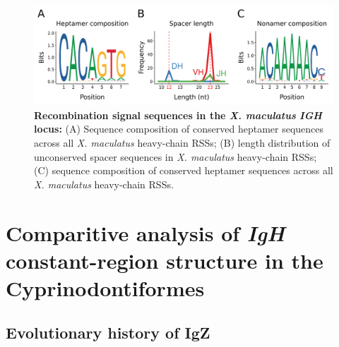 	\begin{figure}
		\begin{subfigure}{0em}
        \label{fig:xma-rss-seqlogo-all-heptamer}
    \end{subfigure}
    \begin{subfigure}{0em}
        \label{fig:xma-rss-seqlogo-all-spacer}
    \end{subfigure}
    \begin{subfigure}{0em}
        \label{fig:xma-rss-seqlogo-all-nonamer}
    \end{subfigure}
	\includegraphics[width=\textwidth]{_Figures/png/xma-rss-seqlogo-all}
	\caption[Recombination signal sequences in the \textit{X. maculatus} \textit{IGH} locus]{\textbf{Recombination signal sequences in the \textit{X. maculatus} \textit{IGH} locus:} (A) Sequence composition of conserved heptamer sequences across all \textit{X. maculatus} heavy-chain RSSs; (B) length distribution of unconserved spacer sequences in \textit{X. maculatus} heavy-chain RSSs; (C) sequence composition of conserved heptamer sequences across all \textit{X. maculatus} heavy-chain RSSs.}
	\label{fig:xma-rss-seqlogo-all}
	\end{figure}



\section{Comparitive analysis of \textit{IgH} constant-region structure in the Cyprinodontiformes}

	\subsection{Evolutionary history of IgZ}
	
